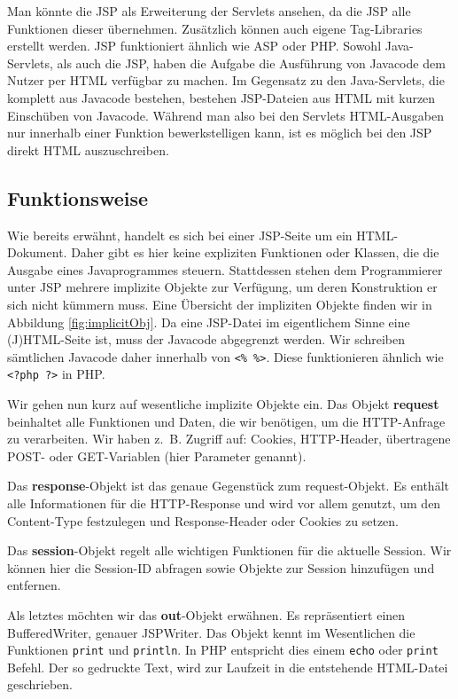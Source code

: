 Man könnte die JSP als Erweiterung der Servlets ansehen, da die JSP alle Funktionen dieser übernehmen. Zusätzlich können auch eigene Tag-Libraries erstellt werden. JSP funktioniert ähnlich wie ASP oder PHP. Sowohl Java-Servlets, als auch die JSP, haben die Aufgabe die Ausführung von Javacode dem Nutzer  per HTML verfügbar zu machen. Im Gegensatz zu den Java-Servlets, die komplett aus Javacode bestehen, bestehen JSP-Dateien aus HTML mit kurzen Einschüben von Javacode. Während man also bei den Servlets HTML-Ausgaben nur innerhalb einer Funktion bewerkstelligen kann, ist es möglich bei den JSP direkt HTML auszuschreiben.

\subsection{Funktionsweise}

Wie bereits erwähnt, handelt es sich bei einer JSP-Seite um ein HTML-Dokument. Daher gibt es hier keine expliziten Funktionen oder Klassen, die die Ausgabe eines Javaprogrammes steuern. Stattdessen stehen dem Programmierer unter JSP mehrere implizite Objekte zur Verfügung, um deren Konstruktion er sich nicht kümmern muss. Eine Übersicht der impliziten Objekte finden wir in Abbildung \ref{fig:implicitObj}. Da eine JSP-Datei im eigentlichem Sinne eine (J)HTML-Seite ist, muss der Javacode abgegrenzt werden. Wir schreiben sämtlichen Javacode daher innerhalb von \verb|<% %>|. Diese funktionieren ähnlich wie \verb|<?php ?>| in PHP.

Wir gehen nun kurz auf wesentliche implizite Objekte ein. Das Objekt \textbf{request} beinhaltet alle Funktionen und Daten, die wir benötigen, um die HTTP-Anfrage zu verarbeiten. Wir haben \mbox{z. B.} Zugriff auf: Cookies, HTTP-Header, übertragene POST- oder GET-Variablen (hier Parameter genannt).

Das \textbf{response}-Objekt ist das genaue Gegenstück zum request-Objekt. Es enthält alle Informationen für die HTTP-Response und wird vor allem genutzt, um den Content-Type festzulegen und Response-Header oder Cookies zu setzen. 

Das \textbf{session}-Objekt regelt alle wichtigen Funktionen für die aktuelle Session. Wir können hier die Session-ID abfragen sowie Objekte zur Session hinzufügen und entfernen.

Als letztes möchten wir das \textbf{out}-Objekt erwähnen. Es repräsentiert einen BufferedWriter, genauer JSPWriter. Das Objekt kennt im Wesentlichen die Funktionen \verb|print| und \verb|println|. In PHP entspricht dies einem \verb|echo| oder \verb|print| Befehl. Der so gedruckte Text, wird zur Laufzeit in die entstehende HTML-Datei geschrieben. 

